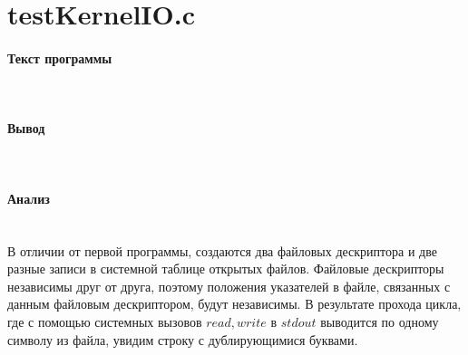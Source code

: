 \section{testKernelIO.c}

\paragraph{Текст программы}\hfill\\


\paragraph{Вывод}\hfill\\


\paragraph{Анализ}\hfill\\

В отличии от первой программы, создаются два файловых дескриптора и две разные записи в системной таблице открытых файлов. Файловые дескрипторы независимы друг от друга, поэтому положения указателей в файле, связанных с данным файловым дескриптором, будут независимы. В результате прохода цикла, где с помощью системных вызовов $read, write$ в $stdout$ выводится по одному символу из файла, увидим строку с дублирующимися буквами.